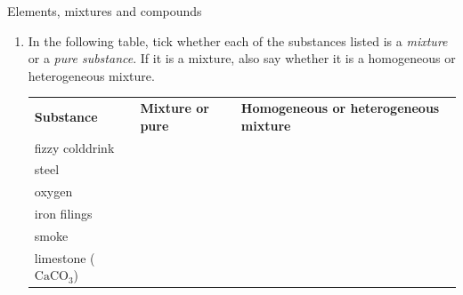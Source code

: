             \begin{exercises}{Elements, mixtures and compounds}{
            \nopagebreak
            \label{m38708*id63472}
 \begin{enumerate}[noitemsep, label=\textbf{\arabic*}. ] 
            \label{m38708*uid28}
    \item In the following table, tick whether each of the substances listed is a \textsl{mixture} or a \textsl{pure substance}. If it is a mixture, also say whether it is a homogeneous or heterogeneous mixture.
          \begin{table}[H]
        \begin{center}
      \label{m38708*id63499}
    \noindent
      \tablelasttail{}
      \begin{xtabular}[t]{|l|l|l|}\hline
        \textbf{Substance} &
        \textbf{Mixture or pure} &
        \textbf{Homogeneous or heterogeneous mixture}%
     \tabularnewline{}
        fizzy colddrink &
         &
     \tabularnewline{}
        steel &
         &
     \tabularnewline{}
        oxygen &
         &
     \tabularnewline{}
        iron filings &
         &
     \tabularnewline{}
        smoke &
         &
     \tabularnewline{}
        limestone (${\mathrm{CaCO}}_{3}$) &
         &
     \tabularnewline{}

\end{xtabular}
\end{center}
\end{table}
\end{enumerate}}
\end{exercises}
